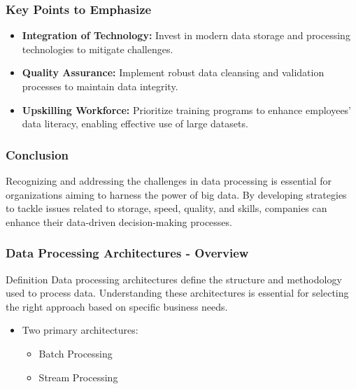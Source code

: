 \documentclass[aspectratio=169]{beamer}
\begin{document}
\begin{frame}[fragile]
    \frametitle{Key Points to Emphasize}
    \begin{itemize}
        \item \textbf{Integration of Technology:} Invest in modern data storage and processing technologies to mitigate challenges.
        \item \textbf{Quality Assurance:} Implement robust data cleansing and validation processes to maintain data integrity.
        \item \textbf{Upskilling Workforce:} Prioritize training programs to enhance employees' data literacy, enabling effective use of large datasets.
    \end{itemize}
\end{frame}

\begin{frame}[fragile]
    \frametitle{Conclusion}
    Recognizing and addressing the challenges in data processing is essential for organizations aiming to harness the power of big data. By developing strategies to tackle issues related to storage, speed, quality, and skills, companies can enhance their data-driven decision-making processes.
\end{frame}

\begin{frame}[fragile]
    \frametitle{Data Processing Architectures - Overview}
    \begin{block}{Definition}
        Data processing architectures define the structure and methodology used to process data. Understanding these architectures is essential for selecting the right approach based on specific business needs.
    \end{block}
    
    \begin{itemize}
        \item Two primary architectures:
        \begin{itemize}
            \item Batch Processing
            \item Stream Processing
        \end{itemize}
    \end{itemize}
\end{frame}
\end{document}
